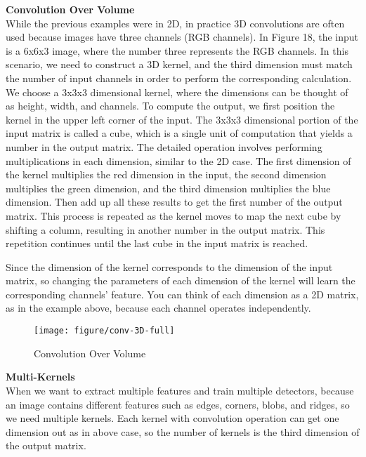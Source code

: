 \documentclass{article}
\begin{document}
\noindent
\textbf{Convolution Over Volume}\\
\noindent
While the previous examples were in 2D, in practice 3D convolutions are often used because images have three channels (RGB channels). In Figure 18, the input is a 6x6x3 image, where the number three represents the RGB channels. In this scenario, we need to construct a 3D kernel, and the third dimension must match the number of input channels in order to perform the corresponding calculation. We choose a 3x3x3 dimensional kernel, where the dimensions can be thought of as height, width, and channels. To compute the output, we first position the kernel in the upper left corner of the input. The 3x3x3 dimensional portion of the input matrix is called a cube, which is a single unit of computation that yields a number in the output matrix. The detailed operation involves performing multiplications in each dimension, similar to the 2D case. The first dimension of the kernel multiplies the red dimension in the input, the second dimension multiplies the green dimension, and the third dimension multiplies the blue dimension. Then add up all these results to get the first number of the output matrix. This process is repeated as the kernel moves to map the next cube by shifting a column, resulting in another number in the output matrix. This repetition continues until the last cube in the input matrix is reached.

Since the dimension of the kernel corresponds to the dimension of the input matrix, so changing the parameters of each dimension of the kernel will learn the corresponding channels' feature. You can think of each dimension as a 2D matrix, as in the example above, because each channel operates independently.\\

\begin{figure}[htbp]
        \centering
        \texttt{[image: figure/conv-3D-full]}
        \caption{Convolution Over Volume}
     \end{figure}




\noindent
\textbf{Multi-Kernels}\\
\noindent
When we want to extract multiple features and train multiple detectors, because an image contains different features such as edges, corners, blobs, and ridges, so we need multiple kernels. Each kernel with convolution operation can get one dimension out as in above case, so the number of kernels is the third dimension of the output matrix.
\end{document}
